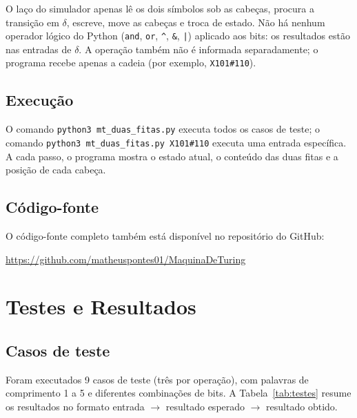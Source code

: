 \documentclass[report, 12pt]{uftreport}
\newcommand{\s}[1]{\texttt{#1}}
\begin{document}
O laço do simulador apenas lê os dois símbolos sob as cabeças, procura a transição
em $\delta$, escreve, move as cabeças e troca de estado. Não há nenhum operador
lógico do Python (\s{and}, \s{or}, \s{\textasciicircum}, \s{\&}, \s{|}) aplicado aos
bits: os resultados estão nas entradas de $\delta$. A operação também não é informada
separadamente; o programa recebe apenas a cadeia (por exemplo, \s{X101\#110}).

\section{Execução}

O comando \s{python3 mt\_duas\_fitas.py} executa todos os casos de teste; o comando
\s{python3 mt\_duas\_fitas.py X101\#110} executa uma entrada específica. A cada
passo, o programa mostra o estado atual, o conteúdo das duas fitas e a posição de
cada cabeça.

\section{Código-fonte}

O código-fonte completo também está disponível no repositório do GitHub:
\begin{center}
\textcolor{uftazul}{\url{https://github.com/matheuspontes01/MaquinaDeTuring}}
\end{center}



\chapter{Testes e Resultados}
\label{cap:testes}

\section{Casos de teste}

Foram executados 9 casos de teste (três por operação), com palavras de comprimento
1 a 5 e diferentes combinações de bits. A Tabela~\ref{tab:testes} resume os
resultados no formato entrada $\rightarrow$ resultado esperado $\rightarrow$
resultado obtido.
\end{document}
